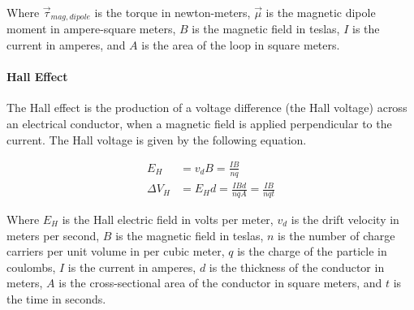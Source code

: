 Where $\vec{\tau}_{mag,dipole}$ is the torque in newton-meters, $\vec{\mu}$ is the magnetic dipole moment in ampere-square meters,
$B$ is the magnetic field in teslas, $I$ is the current in amperes, and $A$ is the area of the loop in square meters.\\


\paragraph*{Hall Effect}
The Hall effect is the production of a voltage difference (the Hall voltage) across an electrical conductor,
when a magnetic field is applied perpendicular to the current. The Hall voltage is given by the following equation.

\begin{align*}
    E_H &= v_dB = \frac{IB}{nq}\\
    \Delta V_H &= E_H d = \frac{IBd}{nqA} = \frac{IB}{nqt}
\end{align*}

Where $E_H$ is the Hall electric field in volts per meter, $v_d$ is the drift velocity in meters per second, $B$ is the magnetic field in teslas,
$n$ is the number of charge carriers per unit volume in per cubic meter, $q$ is the charge of the particle in coulombs, $I$ is the current in amperes,
$d$ is the thickness of the conductor in meters, $A$ is the cross-sectional area of the conductor in square meters, and $t$ is the time in seconds.\\
